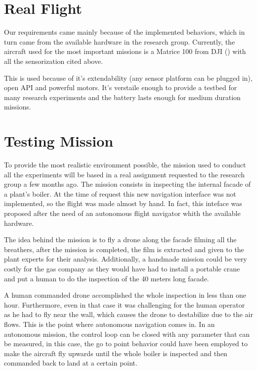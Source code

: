 \section{Real Flight} \label{ch_5:sect:real_flight}

  Our requirements came mainly because of the implemented behaviors, which in turn came from the available hardware in the research group. Currently, the aircraft used for the most important missions is a Matrice 100 from DJI (\cite{dji_matrice_web}) with all the sensorization cited above.

  This is used because of it's extendability (any sensor platform can be plugged in), open API and powerful motors. It's verstaile enough to provide a testbed for many research experiments and the battery lasts enough for medium duration missions.

\section{Testing Mission} \label{ch_5:sect:testing_mission}

  To provide the most realistic environment possible, the mission used to conduct all the experiments will be based in a real assignment requested to the research group a few months ago. The mission consists in inspecting the internal facade of a plant's boiler. At the time of request this new navigation interface was not implemented, so the flight was made almost by hand. In fact, this inteface was proposed after the need of an autonomous flight navigator whith the available hardware.

  The idea behind the mission is to fly a drone along the facade filming all the breathers, after the mission is completed, the film is extracted and given to the plant experts for their analysis. Additionally, a handmade mission could be very costly for the gas company as they would have had to install a portable crane and put a human to do the inspection of the 40 meters long facade.

  A human commanded drone accomplished the whole inspection in less than one hour. Furthermore, even in that case it was challenging for the human operator as he had to fly near the wall, which causes the drone to destabilize due to the air flows. This is the point where autonomous navigation comes in. In an autonomous mission, the control loop can be closed with any parameter that can be measured, in this case, the go to point behavior could have been employed to make the aircraft fly upwards until the whole boiler is inspected and then commanded back to land at a certain point.

